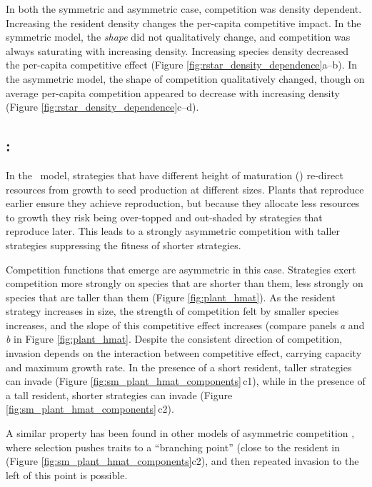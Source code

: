 \documentclass[a4paper,11pt]{article}
\begin{document}
In both the symmetric and asymmetric case, competition was density
dependent.  Increasing the resident density changes the per-capita
competitive impact.
%
In the symmetric model, the \emph{shape} did not qualitatively change,
and competition was always saturating with increasing density.
Increasing species density decreased the per-capita competitive effect
(Figure \ref{fig:rstar_density_dependence}a--b).
%
In the asymmetric model, the shape of competition qualitatively
changed, though on average per-capita competition appeared to decrease
with increasing density (Figure
\ref{fig:rstar_density_dependence}c--d).

\subsection{\plant: \hmat}

In the \plant\ model, strategies that have different height of
maturation (\hmat) re-direct resources from growth to seed production at
different sizes.  Plants that reproduce earlier ensure they achieve
reproduction, but because they allocate less resources to growth they
risk being over-topped and out-shaded by strategies that reproduce
later.  This leads to a strongly asymmetric competition with
taller strategies suppressing the fitness of shorter
strategies.

Competition functions that emerge are asymmetric in this case. Strategies exert competition more strongly on species that are shorter than
them, less strongly on species that are taller than them (Figure \ref{fig:plant_hmat}).  As the
resident strategy increases in size, the strength of competition felt
by smaller species increases, and the slope of this competitive effect
increases (compare panels \textit{a} and \textit{b} in Figure
\ref{fig:plant_hmat}.
%
Despite the consistent direction of competition, invasion depends on
the interaction between competitive effect, carrying capacity and
maximum growth rate. In the presence of a short resident, taller
strategies can invade (Figure \ref{fig:sm_plant_hmat_components}\,c1),
while in the presence of a tall resident, shorter strategies can
invade (Figure \ref{fig:sm_plant_hmat_components}\,c2).

A similar property has been found in other models of asymmetric
competition \citep[e.g.,][]{Kisdi-1999}, where selection pushes traits
to a ``branching point'' (close to the resident in (Figure
\ref{fig:sm_plant_hmat_components}c2), and then repeated invasion to
the left of this point is possible.
\end{document}
